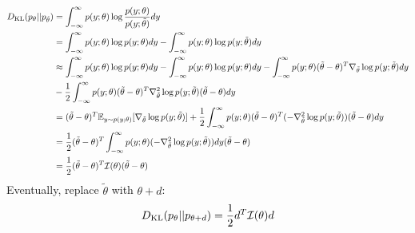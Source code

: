 \begin{answer}
\begin{align*}
    D_{\text{KL}}(p_\theta||p_{\tilde{\theta}}) &= \int_{-\infty}^{\infty} p(y;\theta) \log \frac{p(y;\theta)}{p(y;\tilde{\theta})} dy\\
    &= \int_{-\infty}^{\infty} p(y;\theta) \log p(y;\theta)dy - \int_{-\infty}^{\infty} p(y;\theta) \log p(y;\tilde{\theta}) dy\\
    &\approx \int_{-\infty}^{\infty} p(y;\theta) \log p(y;\theta)dy - \int_{-\infty}^{\infty}p(y;\theta) \log p(y;\theta)dy - \int_{-\infty}^{\infty}p(y;\theta) (\tilde{\theta} - \theta)^T \nabla_{\tilde{\theta}} \log p(y;\tilde{\theta})dy\\
    &- \frac{1}{2}\int_{-\infty}^{\infty}p(y;\theta) (\tilde{\theta} - \theta)^T  \nabla^2_{\tilde{\theta}} \log p(y; \tilde{\theta}) (\tilde{\theta} - \theta)dy\\
    &= (\tilde{\theta} - \theta)^T \mathbb{E}_{y\sim p(y;\theta)} [\nabla_{\tilde{\theta}} \log p(y;\tilde{\theta})] + \frac{1}{2}\int_{-\infty}^{\infty}p(y;\theta) (\tilde{\theta} - \theta)^T  (-\nabla^2_{\tilde{\theta}} \log p(y; \tilde{\theta})) (\tilde{\theta} - \theta)dy\\
    &= \frac{1}{2}(\tilde{\theta} - \theta)^T \int_{-\infty}^\infty p(y;\theta) (-\nabla^2_{\tilde{\theta}} \log p(y; \tilde{\theta}))dy (\tilde{\theta} - \theta)\\
    &= \frac{1}{2}(\tilde{\theta} - \theta)^T \mathcal{I}(\theta) (\tilde{\theta} - \theta)
\end{align*}
Eventually, replace $\tilde{\theta}$ with $\theta+d$:
$$D_{\text{KL}}(p_\theta||p_{\theta+d})=\frac{1}{2}d^T \mathcal{I}(\theta) d$$
\end{answer}

